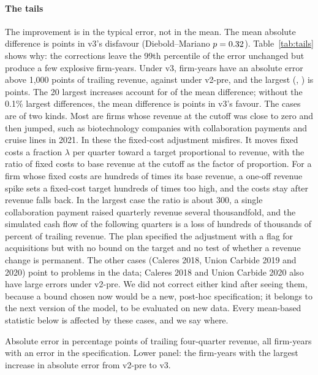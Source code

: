 \documentclass[preprint,12pt,authoryear]{elsarticle}
\begin{document}
\paragraph{The tails} The improvement is in the typical error, not in the mean. The mean absolute difference is \SOneDmMean{} points in v3's disfavour (Diebold--Mariano $p=0.32$). Table~\ref{tab:tails} shows why: the corrections leave the 99th percentile of the error unchanged but produce a few explosive firm-years. Under v3, \TailThousandVthree{} firm-years have an absolute error above 1{,}000 points of trailing revenue, against \TailThousandVtwopre{} under v2-pre, and the largest (\TailTopName, \TailTopYear) is \TailTopErr{} points. The 20 largest increases account for \TailTopShare{} of the mean difference; without the 0.1\% largest differences, the mean difference is \TailTrimDiff{} points in v3's favour. The cases are of two kinds. Most are firms whose revenue at the cutoff was close to zero and then jumped, such as biotechnology companies with collaboration payments and cruise lines in 2021. In these the fixed-cost adjustment misfires. It moves fixed costs a fraction $\lambda$ per quarter toward a target proportional to revenue, with the ratio of fixed costs to base revenue at the cutoff as the factor of proportion. For a firm whose fixed costs are hundreds of times its base revenue, a one-off revenue spike sets a fixed-cost target hundreds of times too high, and the costs stay after revenue falls back. In the largest case the ratio is about 300, a single collaboration payment raised quarterly revenue several thousandfold, and the simulated cash flow of the following quarters is a loss of hundreds of thousands of percent of trailing revenue. The plan specified the adjustment with a flag for acquisitions but with no bound on the target and no test of whether a revenue change is permanent. The other cases (Caleres 2018, Union Carbide 2019 and 2020) point to problems in the data; Caleres 2018 and Union Carbide 2020 also have large errors under v2-pre. We did not correct either kind after seeing them, because a bound chosen now would be a new, post-hoc specification; it belongs to the next version of the model, to be evaluated on new data. Every mean-based statistic below is affected by these cases, and we say where.

\begin{table}[t]
\centering\scriptsize
\caption{The tails of the absolute errors of eight-quarter operating cash flow}
\label{tab:tails}
\resizebox{\linewidth}{!}{}
\par\smallskip
\begin{minipage}{\linewidth}\footnotesize
Absolute error in percentage points of trailing four-quarter revenue, all firm-years with an error in the specification. Lower panel: the firm-years with the largest increase in absolute error from v2-pre to v3.
\end{minipage}
\end{table}
\end{document}
